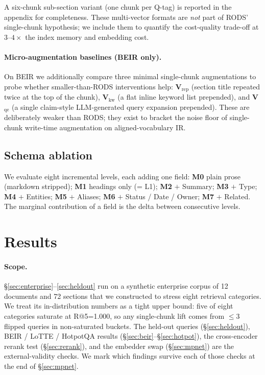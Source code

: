 \documentclass[11pt]{article}
\begin{document}
A six-chunk sub-section variant (one chunk per Q-tag) is reported
in the appendix for completeness. These multi-vector formats are
\emph{not} part of RODS' single-chunk hypothesis; we include them to
quantify the cost-quality trade-off at $3$--$4\times$ the index
memory and embedding cost.

\paragraph{Micro-augmentation baselines (BEIR only).}
On BEIR we additionally compare three minimal single-chunk
augmentations to probe whether smaller-than-RODS interventions help:
\textbf{V$_{\text{rep}}$} (section title repeated twice at the top
of the chunk), \textbf{V$_{\text{kw}}$} (a flat inline keyword list
prepended), and \textbf{V$_{\text{qe}}$} (a single claim-style
LLM-generated query expansion prepended). These are deliberately
weaker than RODS; they exist to bracket the noise floor of
single-chunk write-time augmentation on aligned-vocabulary IR.

\subsection{Schema ablation}
\label{sec:ablation}
We evaluate eight incremental levels, each adding one field:
\textbf{M0} plain prose (markdown stripped); \textbf{M1} headings only
(= L1); \textbf{M2} $+$ Summary; \textbf{M3} $+$ Type; \textbf{M4}
$+$ Entities; \textbf{M5} $+$ Aliases; \textbf{M6} $+$ Status / Date
/ Owner; \textbf{M7} $+$ Related. The marginal contribution of a
field is the delta between consecutive levels.

\section{Results}
\label{sec:results}

\paragraph{Scope.} \S\ref{sec:enterprise}--\ref{sec:heldout} run on a
synthetic enterprise corpus of 12 documents and 72 sections that we
constructed to stress eight retrieval categories. We treat its
in-distribution numbers as a tight upper bound: five of eight
categories saturate at R@5=1.000, so any single-chunk lift comes
from $\leq 3$ flipped queries in non-saturated buckets. The held-out
queries (\S\ref{sec:heldout}), BEIR / LoTTE / HotpotQA results
(\S\ref{sec:beir}--\S\ref{sec:hotpot}), the cross-encoder rerank
test (\S\ref{sec:rerank}), and the embedder swap (\S\ref{sec:mpnet})
are the external-validity checks. We mark which findings survive
each of those checks at the end of \S\ref{sec:mpnet}.
\end{document}
